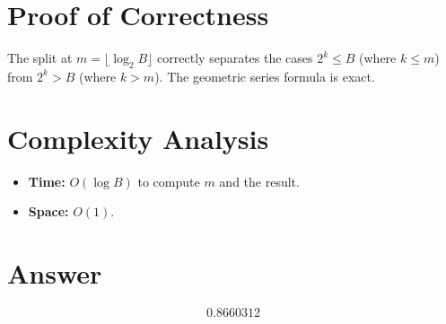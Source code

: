 \documentclass[11pt]{article}
\begin{document}
\section{Proof of Correctness}
The split at $m = \lfloor \log_2 B \rfloor$ correctly separates the cases $2^k \le B$ (where $k \le m$) from $2^k > B$ (where $k > m$). The geometric series formula is exact.

\section{Complexity Analysis}
\begin{itemize}
    \item \textbf{Time:} $O(\log B)$ to compute $m$ and the result.
    \item \textbf{Space:} $O(1)$.
\end{itemize}

\section{Answer}

\[
\boxed{0.8660312}
\]
\end{document}

